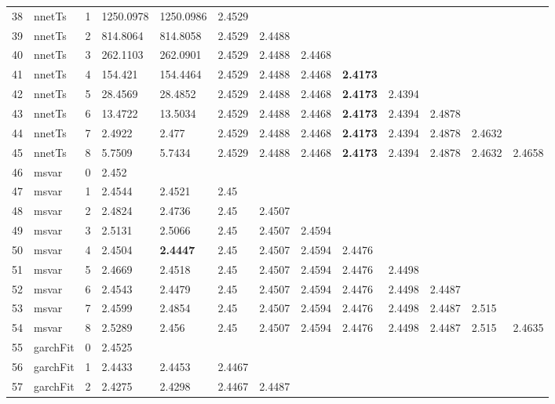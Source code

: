\documentclass[10pt,a4paper]{article}
\begin{document}
\begin{table}[ht]
\begin{tabular}{rlrllllllllll}
  38 & nnetTs &     1 & 1250.0978 & 1250.0986 & 2.4529 &  &  &  &  &  &  &  \\ 
  39 & nnetTs &     2 & 814.8064 & 814.8058 & 2.4529 & 2.4488 &  &  &  &  &  &  \\ 
  40 & nnetTs &     3 & 262.1103 & 262.0901 & 2.4529 & 2.4488 & 2.4468 &  &  &  &  &  \\ 
  41 & nnetTs &     4 & 154.421 & 154.4464 & 2.4529 & 2.4488 & 2.4468 & \textbf{2.4173} &  &  &  &  \\ 
  42 & nnetTs &     5 & 28.4569 & 28.4852 & 2.4529 & 2.4488 & 2.4468 & \textbf{2.4173} & 2.4394 &  &  &  \\ 
  43 & nnetTs &     6 & 13.4722 & 13.5034 & 2.4529 & 2.4488 & 2.4468 & \textbf{2.4173} & 2.4394 & 2.4878 &  &  \\ 
  44 & nnetTs &     7 & 2.4922 & 2.477 & 2.4529 & 2.4488 & 2.4468 & \textbf{2.4173} & 2.4394 & 2.4878 & 2.4632 &  \\ 
  45 & nnetTs &     8 & 5.7509 & 5.7434 & 2.4529 & 2.4488 & 2.4468 & \textbf{2.4173} & 2.4394 & 2.4878 & 2.4632 & 2.4658 \\ 
   \hline
46 & msvar &     0 & 2.452 &  &  &  &  &  &  &  &  &  \\ 
  47 & msvar &     1 & 2.4544 & 2.4521 & 2.45 &  &  &  &  &  &  &  \\ 
  48 & msvar &     2 & 2.4824 & 2.4736 & 2.45 & 2.4507 &  &  &  &  &  &  \\ 
  49 & msvar &     3 & 2.5131 & 2.5066 & 2.45 & 2.4507 & 2.4594 &  &  &  &  &  \\ 
  50 & msvar &     4 & 2.4504 & \textbf{2.4447} & 2.45 & 2.4507 & 2.4594 & 2.4476 &  &  &  &  \\ 
  51 & msvar &     5 & 2.4669 & 2.4518 & 2.45 & 2.4507 & 2.4594 & 2.4476 & 2.4498 &  &  &  \\ 
  52 & msvar &     6 & 2.4543 & 2.4479 & 2.45 & 2.4507 & 2.4594 & 2.4476 & 2.4498 & 2.4487 &  &  \\ 
  53 & msvar &     7 & 2.4599 & 2.4854 & 2.45 & 2.4507 & 2.4594 & 2.4476 & 2.4498 & 2.4487 & 2.515 &  \\ 
  54 & msvar &     8 & 2.5289 & 2.456 & 2.45 & 2.4507 & 2.4594 & 2.4476 & 2.4498 & 2.4487 & 2.515 & 2.4635 \\ 
   \hline
55 & garchFit &     0 & 2.4525 &  &  &  &  &  &  &  &  &  \\ 
  56 & garchFit &     1 & 2.4433 & 2.4453 & 2.4467 &  &  &  &  &  &  &  \\ 
  57 & garchFit &     2 & 2.4275 & 2.4298 & 2.4467 & 2.4487 &  &  &  &  &  &  \\ 

\end{tabular}
\end{table}
\end{document}
